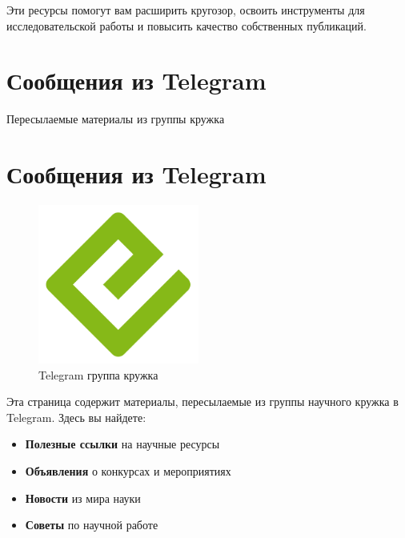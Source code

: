 \documentclass[
  russian,
  letterpaper,
]{book}
\providecommand{\tightlist}{%
  \setlength{\itemsep}{0pt}\setlength{\parskip}{0pt}}
\begin{document}
Эти ресурсы помогут вам расширить кругозор, освоить инструменты для
исследовательской работы и повысить качество собственных публикаций.


\chapter{Сообщения из
Telegram}\label{ux441ux43eux43eux431ux449ux435ux43dux438ux44f-ux438ux437-telegram}

Пересылаемые материалы из группы кружка

\hfill\break


\chapter{Сообщения из Telegram}\label{sec-telegram}

\begin{figure}[H]

{\centering \includegraphics[width=2.08333in,height=\textheight,keepaspectratio]{cover.png}

}

\caption{Telegram группа кружка}

\end{figure}%

Эта страница содержит материалы, пересылаемые из группы научного кружка
в Telegram. Здесь вы найдете:

\begin{itemize}
\tightlist
\item
  \textbf{Полезные ссылки} на научные ресурсы
\item
  \textbf{Объявления} о конкурсах и мероприятиях
\item
  \textbf{Новости} из мира науки
\item
  \textbf{Советы} по научной работе
\end{itemize}
\end{document}

